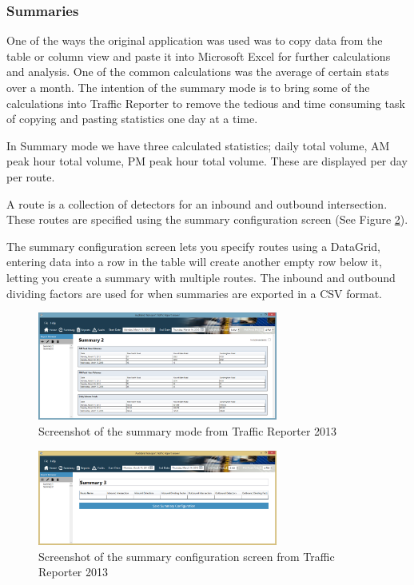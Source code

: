 \documentclass{article}
\begin{document}
\subsubsection{Summaries}
One of the ways the original application was used was to copy data from the table or column view and paste it into Microsoft Excel for further calculations and analysis. One of the common calculations was the average of certain stats over a month. The intention of the summary mode is to bring some of the calculations into Traffic Reporter to remove the tedious and time consuming task of copying and pasting statistics one day at a time.

In Summary mode we have three calculated statistics; daily total volume, AM peak hour total volume, PM peak hour total volume. These are displayed per day per route.

A route is a collection of detectors for an inbound and outbound intersection. These routes are specified using the summary configuration screen (See Figure \ref{fig:summaryConfig}).

The summary configuration screen lets you specify routes using a DataGrid, entering data into a row in the table will create another empty row below it, letting you create a summary with multiple routes. The inbound and outbound dividing factors are used for when summaries are exported in a CSV format.

\begin{figure}[!b]
\centerline{\includegraphics[width=3.1in]{summary}}
\caption{Screenshot of the summary mode from Traffic Reporter 2013}
\label{fig:summary}
\end{figure}

\begin{figure}[!b]
\centerline{\includegraphics[width=3.1in]{summaryConfig}}
\caption{Screenshot of the summary configuration screen from Traffic Reporter 2013}
\label{fig:summaryConfig}
\end{figure}
\end{document}
